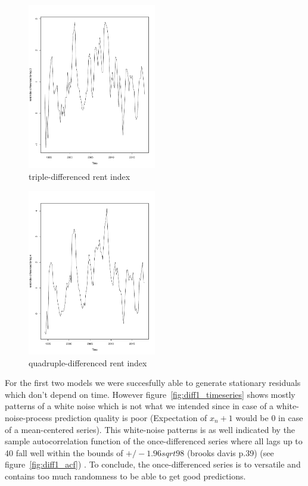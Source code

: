 \documentclass[11pt,a4paper]{article}
\begin{document}
\begin{figure}[!htb]
\centering
\includegraphics[angle=0,
width=0.5\textwidth]{diff3_timeseries}
\caption{triple-differenced rent index
\label{fig:diff3_timeseries}}
\end{figure}
\begin{figure}[!htb]
\centering
\includegraphics[angle=0,
width=0.5\textwidth]{diff4_timeseries}
\caption{quadruple-differenced rent index
\label{fig:diff4_timeseries}}
\end{figure}
For the first two models we were succesfully able to generate stationary residuals which don't depend on time. However figure~\ref{fig:diff1_timeseries} shows mostly patterns of a white noise which is not what we intended since in case of a white-noise-process prediction quality is poor (Expectation of $x_n+1$ would be 0 in case of a mean-centered series). This white-noise patterns is as well indicated by the sample autocorrelation function of the once-differenced series where all lags up to 40 fall well within the bounds of $+/-1.96sqrt{98}$ (brooks davis p.39)  (see figure~\ref{fig:diff1_acf}) . To conclude, the once-differenced series is to versatile and contains too much randomness to be able to get good predictions.
\end{document}
